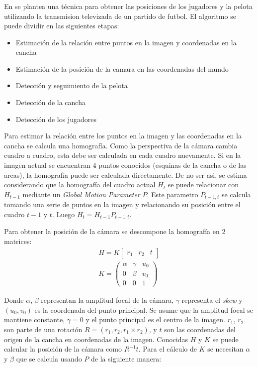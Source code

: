 \documentclass[a4paper,10pt]{article}
\begin{document}
\subsubsection{}

En \cite{LIU20061146} se plantea una técnica para obtener las posiciones de los
jugadores y la pelota utilizando la transmision televizada de un partido de
futbol. El algoritmo se puede dividir en las siguientes etapas:

\begin{itemize}
  \item Estimación de la relación entre puntos en la imagen y coordenadas en la cancha
  \item Estimación de la posición de la camara en las coordenadas del mundo
  \item Detección y seguimiento de la pelota
  \item Detección de la cancha
  \item Detección de los jugadores
\end{itemize}

Para estimar la relación entre los puntos en la imagen y las coordenadas en la cancha se calcula una homografía.
Como la perspectiva de la cámara cambia cuadro a cuadro, esta debe ser calculada en cada cuadro nuevamente.
Si en la imagen actual se encuentran 4 puntos conocidos (esquinas de la cancha o de las areas), la homografía puede ser calculada directamente.
De no ser asi, se estima considerando que la homografía del cuadro actual $H_t$ se puede relacionar con $H_{t-1}$ mediante un \textit{Global Motion Parameter} $P$.
Este parametro $P_{t-1,t}$ se calcula tomando una serie de puntos en la imagen y relacionando su posición entre el cuadro $t-1$ y $t$.
Luego $ H_t = H_{t-1} P_{t-1,t}$.

Para obtener la posición de la cámara se descompone la homografía en 2 matrices:
\begin{eqnarray*}
H = K \begin{bmatrix} r_1 & r_2 & t \end{bmatrix} \\
K = \begin{pmatrix}
    \alpha & \gamma & u_0 \\
    0 & \beta & v_0 \\
    0 & 0 & 1
    \end{pmatrix}
\end{eqnarray*}

Donde $\alpha$, $\beta$ representan la amplitud focal de la cámara, $\gamma$ representa el \textit{skew} y $(u_0, v_0)$ es la coordenada del punto principal.
Se asume que la amplitud focal se mantiene constante, $\gamma = 0$ y el punto principal es el centro de la imagen.
$r_1$, $r_2$ son parte de una rotación $R = (r_1, r_2, r_1 \times r_2)$, y $t$ son las coordenadas del origen de la cancha en coordenadas de la imagen.
Conocidas $H$ y $K$ se puede calcular la posición de la cámara como $R^{-1} t$.
Para el cálculo de $K$ se necesitan $\alpha$ y $\beta$ que se calcula usando $P$ de la siguiente manera:
\end{document}
